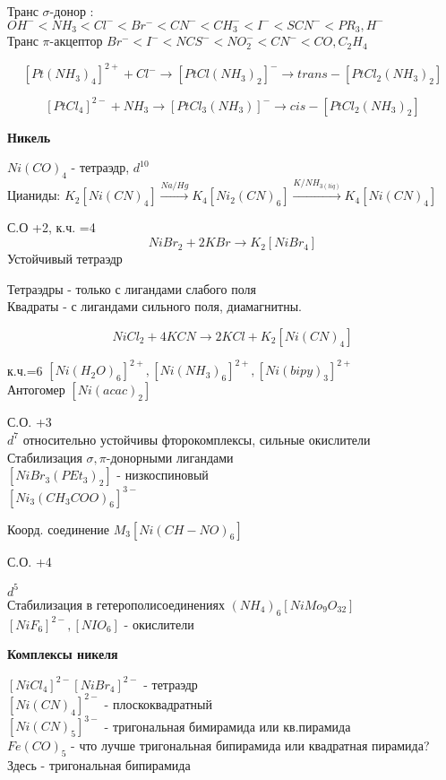 Транс $\sigma$-донор : $OH^- < NH_3 < Cl^- < Br^- < CN^- < CH_3^- <I^- < SCN^- < PR_3 , H^-$\\
Транс $\pi$-акцептор $Br^- < I^- < NCS^- < NO_2^- < CN^- < CO , C_2H_4$

$$[Pt(NH_3)_4]^{2+} + Cl^- \rightarrow [PtCl(NH_3)_2]^- \rightarrow trans-[PtCl_2(NH_3)_2]$$

$$[PtCl_4]^{2-} + NH_3 \rightarrow [PtCl_3(NH_3)]^- \rightarrow cis-[PtCl_2(NH_3)_2]$$

\textbf{Никель}

$Ni(CO)_4$ - тетраэдр, $d^{10}$\\
Цианиды: $K_2[Ni(CN)_4] \xrightarrow{Na/Hg} K_4[Ni_2(CN)_6] \xrightarrow{K/NH_{3(liq)}} K_4[Ni(CN)_4]$

С.О +2, к.ч. =4\\
$$NiBr_2 + 2KBr \rightarrow K_2[NiBr_4]$$
Устойчивый тетраэдр

Тетраэдры - только с лигандами слабого поля\\
Квадраты - с лигандами сильного поля, диамагнитны.

$$NiCl_2 + 4KCN \rightarrow 2KCl + K_2[Ni(CN)_4]$$

к.ч.=6 $[Ni(H_2O)_6]^{2+}, [Ni(NH_3)_6]^{2+}, [Ni(bipy)_3]^{2+}$\\
Антогомер $[Ni(acac)_2]$

С.О. +3\\
$d^7$ относительно устойчивы фторокомплексы, сильные окислители\\
Стабилизация $\sigma,\pi$-донорными лигандами\\
$[NiBr_3(PEt_3)_2]$ - низкоспиновый\\
$[Ni_3(CH_3COO)_6]^{3-}$

Коорд. соединение $M_3[Ni(CH-NO)_6]$

С.О.  +4

$d^5$\\
Стабилизация в гетерополисоединениях $(NH_4)_6[NiMo_9O_{32}]$\\
$[NiF_6]^{2-},  [NIO_6]$ - окислители

\textbf{Комплексы никеля}

$[NiCl_4]^{2-} [NiBr_4]^{2-}$  - тетраэдр\\
$[Ni(CN)_4]^{2-}$ - плоскоквадратный\\
$[Ni(CN)_5]^{3-}$ - тригональная бимирамида или кв.пирамида\\
$Fe(CO)_5$ - что лучше тригональная бипирамида или квадратная пирамида? Здесь - тригональная бипирамида

